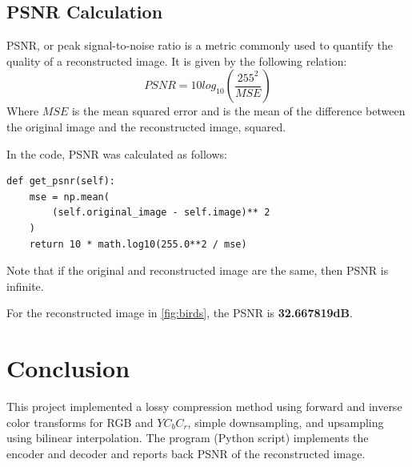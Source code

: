 \documentclass[10pt,twocolumn,letterpaper]{article}
\begin{document}
\subsection{PSNR Calculation}
PSNR, or peak signal-to-noise ratio is a metric commonly used to quantify the quality of a reconstructed image. It is given by the following relation:
\begin{equation}
    PSNR = 10log_{10}(\frac{255^2}{MSE})
\end{equation}
Where $MSE$ is the mean squared error and is the mean of the difference between the original image and the reconstructed image, squared.

In the code, PSNR was calculated as follows:
{\footnotesize
\begin{verbatim}
def get_psnr(self):
    mse = np.mean(
        (self.original_image - self.image)** 2
    )
    return 10 * math.log10(255.0**2 / mse)
\end{verbatim}}
Note that if the original and reconstructed image are the same, then PSNR is infinite.

For the reconstructed image in \cref{fig:birds}, the PSNR is \textbf{32.667819dB}.
\section{Conclusion}
This project implemented a lossy compression method using forward and inverse color transforms for RGB and $YC_bC_r$, simple downsampling, and upsampling using bilinear interpolation. The program (Python script) implements the encoder and decoder and reports back PSNR of the reconstructed image. 

{\small


}
\end{document}
